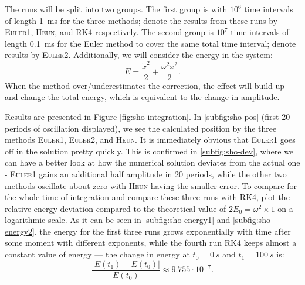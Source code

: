 \documentclass[]{article}
\newcommand{\eulerOne}{\textsc{Euler1}}
\newcommand{\eulerTwo}{\textsc{Euler2}}
\newcommand{\heun}{\textsc{Heun}}
\newcommand{\rkFour}{\textsc{RK4}}
\begin{document}
	The runs will be split into two groups. The first group is with $10^6$ time intervals of length \SI{1}{ms} for the three methods; denote the results from these runs by \eulerOne{}, \heun{}, and \rkFour{} respectively. The second group is $10^7$ time intervals of length \SI{0.1}{ms} for the Euler method to cover the same total time interval; denote results by \eulerTwo{}. Additionally, we will consider the energy in the system:
	\begin{equation}
		E = \frac{\dot{x}^2}{2} + \frac{\omega^2 x^2}{2}.
	\end{equation}
	When the method over/underestimates the correction, the effect will build up and change the total energy, which is equivalent to the change in amplitude.

	Results are presented in Figure \ref{fig:sho-integration}. In \ref{subfig:sho-pos} (first 20 periods of oscillation displayed), we see the calculated position by the three methods \eulerOne{}, \eulerTwo{}, and \heun{}. It is immediately obvious that \eulerOne{} goes off in the solution pretty quickly. This is confirmed in \ref{subfig:sho-dev}, where we can have a better look at how the numerical solution deviates from the actual one - \eulerOne{} gains an additional half amplitude in 20 periods, while the other two methods oscillate about zero with \heun{} having the smaller error. To compare for the whole time of integration and compare these three runs with \rkFour{}, plot the relative energy deviation compared to the theoretical value of $2E_0 = \omega^2 \times 1$ on a logarithmic scale. As it can be seen in \ref{subfig:sho-energy1} and \ref{subfig:sho-energy2}, the energy for the first three runs grows exponentially with time after some moment with different exponents, while the fourth run \rkFour{} keeps almost a constant value of energy --- the change in energy at $t_0=\SI{0}{s}$ and $t_1=\SI{100}{s}$ is:
	\begin{equation}
		\frac{\big| E(t_1) - E(t_0) \big|}{E(t_0)} \approx 9.755 \cdot 10^{-7}.
	\end{equation}
\end{document}
